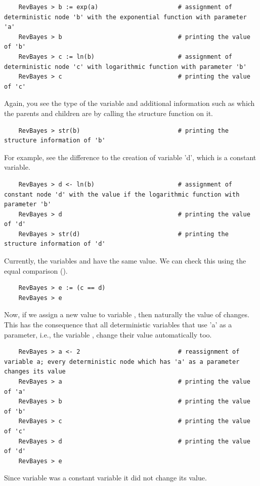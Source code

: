 {\tt \begin{snugshade*}
\begin{lstlisting}    
    RevBayes > b := exp(a)                      # assignment of deterministic node 'b' with the exponential function with parameter 'a'
    RevBayes > b                                # printing the value of 'b'
    RevBayes > c := ln(b)                       # assignment of deterministic node 'c' with logarithmic function with parameter 'b'
    RevBayes > c                                # printing the value of 'c'
\end{lstlisting}
\end{snugshade*}}
Again, you see the type of the variable and additional information such as which the parents and children are by calling the structure function on it.
{\tt \begin{snugshade*}
\begin{lstlisting}    
    RevBayes > str(b)                           # printing the structure information of 'b'
\end{lstlisting}
\end{snugshade*}}
For example, see the difference to the creation of variable 'd', which is a constant variable.
{\tt \begin{snugshade*}
\begin{lstlisting}    
    RevBayes > d <- ln(b)                       # assignment of constant node 'd' with the value if the logarithmic function with parameter 'b'
    RevBayes > d                                # printing the value of 'd'
    RevBayes > str(d)                           # printing the structure information of 'd'
\end{lstlisting}
\end{snugshade*}}
Currently, the variables  and  have the same value. 
We can check this using the equal comparison (\cl{==}).
{\tt \begin{snugshade*}
\begin{lstlisting}    
    RevBayes > e := (c == d)			
    RevBayes > e
\end{lstlisting}
\end{snugshade*}}
Now, if we assign a new value to variable , then naturally the value of  changes. 
This has the consequence that all deterministic variables that use 'a' as a parameter, i.e., the variable , change their value automatically too.
{\tt \begin{snugshade*}
\begin{lstlisting}    
    RevBayes > a <- 2                           # reassignment of variable a; every deterministic node which has 'a' as a parameter changes its value
    RevBayes > a                                # printing the value of 'a'
    RevBayes > b                                # printing the value of 'b'
    RevBayes > c                                # printing the value of 'c'
    RevBayes > d                                # printing the value of 'd'
    RevBayes > e
\end{lstlisting}
\end{snugshade*}}
Since variable  was a constant variable it did not change its value. 

